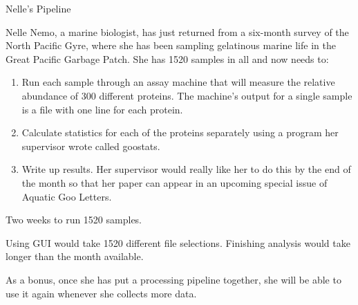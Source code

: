 \documentclass[aspectratio=1610, 11pt]{beamer} %
\begin{document}
\begin{frame}{Nelle's Pipeline}

Nelle Nemo, a marine biologist, has just returned from a six-month survey of the North Pacific Gyre, where she has been sampling gelatinous marine life in the Great Pacific Garbage Patch. She has 1520 samples in all and now needs to:
\begin{enumerate}[label=\arabic*)]
    \item Run each sample through an assay machine that will measure the relative abundance of 300 different proteins. The machine’s output for a single sample is a file with one line for each protein.
    \item Calculate statistics for each of the proteins separately using a program her supervisor wrote called goostats.
    \item Write up results. Her supervisor would really like her to do this by the end of the month so that her paper can appear in an upcoming special issue of Aquatic Goo Letters.
\end{enumerate}

Two weeks to run 1520 samples.     

Using GUI would take 1520 different file selections. Finishing analysis would take longer than the month available.


As a bonus, once she has put a processing pipeline together, she will be able to use it again whenever she collects more data.
\end{frame}


\end{document}

